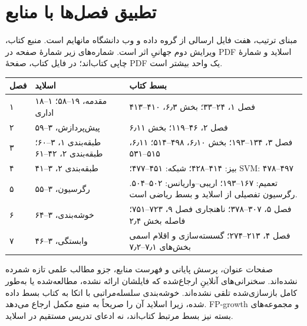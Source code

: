 \section{تطبیق فصل‌ها با منابع}
مبنای ترتیب، هفت فایل  ارسالی از گروه داده و وب دانشگاه مانهایم است. منبع کتاب، ویرایش دوم جهانیِ  اثر  است. شماره‌های زیر شمارهٔ صفحه در PDF اسلاید و شمارهٔ چاپی کتاب‌اند؛ در فایل کتاب، صفحهٔ PDF یک واحد بیشتر است.
\begin{longtable}{p{20mm}p{51mm}p{70mm}}
\toprule
فصل & اسلاید & بسط کتاب\\\midrule\endhead
۱ & مقدمه، ۱۹–۵۸؛ ۱–۱۸ اداری & فصل ۱، ۲۴–۳۳؛ بخش ۶٫۳، ۴۱۰–۴۱۳\\
۲ & پیش‌پردازش، ۳–۵۹ & فصل ۲، ۴۶–۱۱۹؛ بخش ۶٫۱۱\\
۳ & طبقه‌بندی ۱، ۳–۶۰؛ طبقه‌بندی ۲، ۴۲–۶۱ & فصل ۳، ۱۳۴–۱۹۳؛ بخش ۶٫۱۰، ۴۹۸–۵۱۴؛ ۶٫۱۱، ۵۱۵–۵۳۱\\
۴ & طبقه‌بندی ۲، ۳–۴۱ & بیز: ۴۱۴–۴۲۸؛ شبکه: ۴۵۱–۴۷۷؛ SVM: ۴۷۸–۴۹۷\\
۵ & رگرسیون، ۳–۵۵ & تعمیم: ۱۶۷–۱۹۳؛ اریبی–واریانس: ۵۰۲–۵۰۴. رگرسیون تفصیلی از اسلاید و بسط ریاضی است.\\
۶ & خوشه‌بندی، ۳–۶۴ & فصل ۵، ۳۰۷–۳۷۸؛ ناهنجاری فصل ۹، ۷۲۳–۷۵۱؛ فاصله بخش ۲٫۴\\
۷ & وابستگی، ۳–۴۶ & فصل ۴، ۲۱۳–۲۷۴؛ گسسته‌سازی و اقلام اسمی بخش‌های ۷٫۱–۷٫۲\\
\bottomrule
\end{longtable}
صفحات عنوان، پرسش پایانی و فهرست منابع، جزو مطالب علمی تازه شمرده نشده‌اند. سخنرانی‌های آنلاینِ ارجاع‌شده که فایلشان ارائه نشده، مطالعه‌شده یا به‌طور کامل بازسازی‌شده تلقی نشده‌اند. خوشه‌بندی سلسله‌مراتبی با اتکا به کتاب بسط داده شده، زیرا اسلاید آن را صریحاً به منبع مکمل ارجاع می‌دهد. FP-growth و مجموعه‌های بسته نیز بسط مرتبط کتاب‌اند، نه ادعای تدریس مستقیم در اسلاید.

